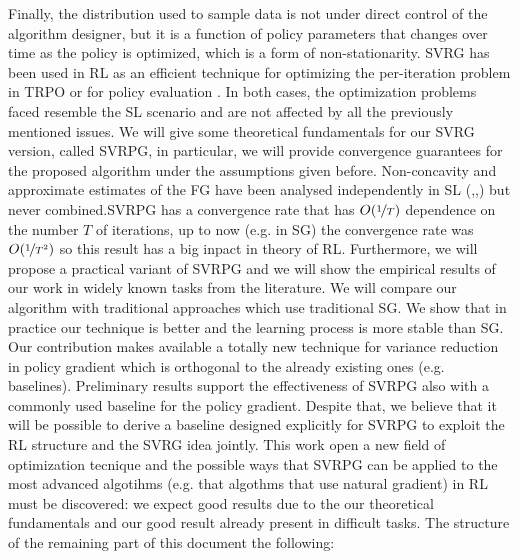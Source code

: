 Finally, the distribution used to sample data is not under direct control of the algorithm designer, but it is a function of policy parameters that changes over time as the policy is optimized, which is a form of non-stationarity. 
\acs{SVRG} has been used in \acs{RL} as an efficient technique for optimizing the per-iteration problem in \ac{TRPO} \citep{xu2017stochastic} or for policy evaluation \citep{du2017stochastic}. In both cases, the optimization problems faced resemble the \acs{SL} scenario and are not affected by all the previously mentioned issues.
We will give some theoretical fundamentals for our \acs{SVRG} version, called \acs{SVRPG}, in particular, we will provide convergence guarantees for the proposed algorithm under the assumptions given before. Non-concavity and approximate estimates of the FG have been analysed independently in SL (\cite{allen2016variance},\cite{reddi2016stochastic},\cite{harikandeh2015stopwasting}) but never combined.\newline SVRPG has a convergence rate that has $O(\nicefrac{1}{T})$ dependence on the number $T$ of iterations, up to now (e.g. in \acs{SG}) the convergence rate was  $O(\nicefrac{1}{T^2})$ so this result has a big inpact in theory of \acs{RL}.\newline
 Furthermore, we will propose a practical variant of \acs{SVRPG} and we will show the empirical results of our work in widely known tasks from the literature. We will compare our algorithm with traditional approaches which use traditional \acs{SG}. We show that in practice our technique is better and the learning process is more stable than \acs{SG}.\newline
Our contribution makes available a totally new technique for variance reduction in policy gradient which is orthogonal to the already existing ones (e.g. baselines).
Preliminary results support the effectiveness of SVRPG also with a commonly used baseline for the policy gradient. Despite that, we believe that it will be possible to derive a baseline designed explicitly for SVRPG to exploit the RL structure and the SVRG idea jointly.\newline
This work open a new field of optimization tecnique and the possible ways that \acs{SVRPG} can be applied to the most advanced algotihms (e.g. that algothms that use natural gradient) in \acs{RL} must be discovered: we expect good results due to the our theoretical fundamentals and our good result already present in difficult tasks.\newline
The structure of the remaining part of this document the following:
